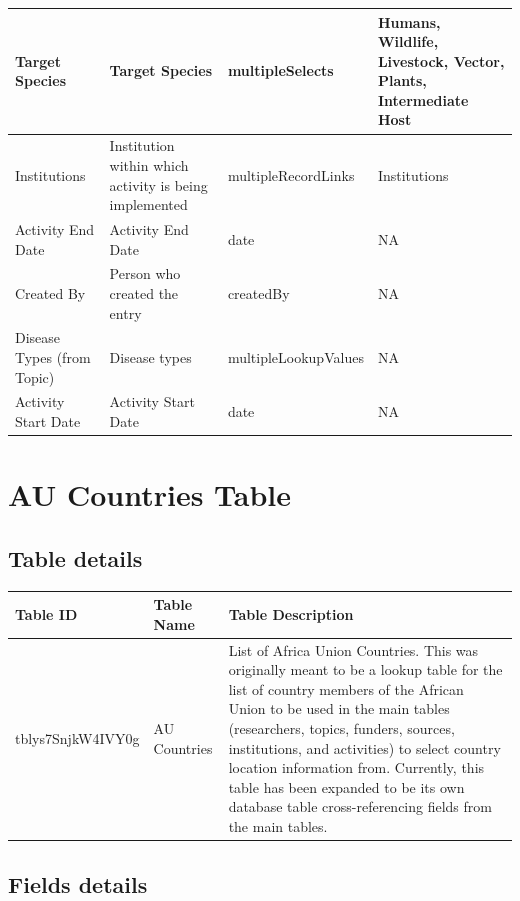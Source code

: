 \documentclass[
]{book}
\begin{document}
\begin{table}
\begin{tabular}{l|l|l|l}
\hline
Target Species & Target Species & multipleSelects & Humans, Wildlife, Livestock, Vector, Plants, Intermediate Host\\
\hline
Institutions & Institution within which activity is being implemented & multipleRecordLinks & Institutions\\
\hline
Activity End Date & Activity End Date & date & NA\\
\hline
Created By & Person who created the entry & createdBy & NA\\
\hline
Disease Types (from Topic) & Disease types & multipleLookupValues & NA\\
\hline
Activity Start Date & Activity Start Date & date & NA\\
\hline
\end{tabular}
\end{table}

\hypertarget{au-countries-table}{%
\section{AU Countries Table}\label{au-countries-table}}

\hypertarget{table-details-1}{%
\subsection{Table details}\label{table-details-1}}

\begin{table}
\centering
\begin{tabular}{l|l|l}
\hline
\textbf{Table ID} & \textbf{Table Name} & \textbf{Table Description}\\
\hline
tblys7SnjkW4IVY0g & AU Countries & List of Africa Union Countries. This was originally meant to be a lookup table for the list of country members of the African Union to be used in the main tables (researchers, topics, funders, sources, institutions, and activities) to select country location information from. Currently, this table has been expanded to be its own database table cross-referencing fields from the main tables.\\
\hline
\end{tabular}
\end{table}

\hypertarget{fields-details-1}{%
\subsection{Fields details}\label{fields-details-1}}
\end{document}
